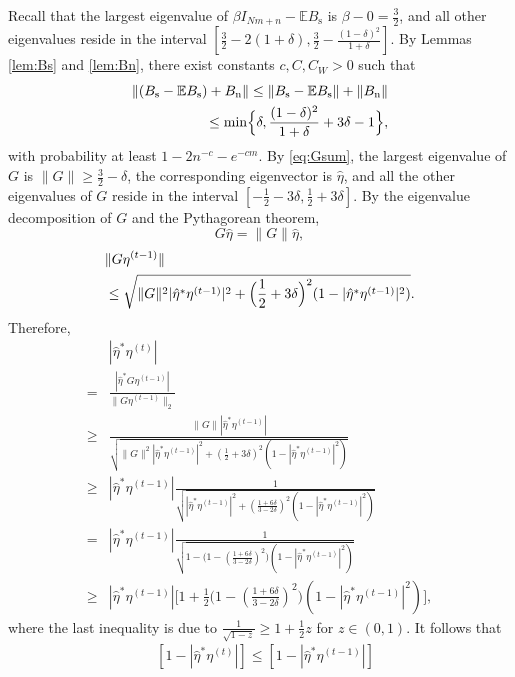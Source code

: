 \documentclass[11pt,journal]{IEEEtran}
\newcommand{\bbE}{\mathbb{E}}
\newcommand{\rms}{\mathrm{s}}
\newcommand{\rmn}{\mathrm{n}}
\newcommand{\norm}[1]{\|{#1}\|}
\begin{document}
\begin{IEEEproof}
Recall that the largest eigenvalue of $\beta I_{Nm+n} - \bbE B_\rms$ is $\beta - 0 = \frac{3}{2}$, and all other eigenvalues reside in the interval $[\frac{3}{2} - 2(1+\delta), \frac{3}{2} - \frac{(1-\delta)^2}{1+\delta}]$. By Lemmas \ref{lem:Bs} and \ref{lem:Bn}, there exist constants $c,C,C_W>0$ such that
\begin{align*}
\norm{(B_\rms - \bbE B_\rms) + B_\rmn} \leq \norm{B_\rms - \bbE B_\rms} + \norm{B_\rmn} \\
\leq \min\Bigl\{\delta, \frac{(1-\delta)^2}{1+\delta} +3\delta -1\Bigr\},
\end{align*}
with probability at least $1-2n^{-c}-e^{-cm}$. By \eqref{eq:Gsum}, the largest eigenvalue of $G$ is $\norm{G} \geq \frac{3}{2} - \delta$, the corresponding eigenvector is $\hat{\eta}$, and all the other eigenvalues of $G$ reside in the interval $[-\frac{1}{2}-3\delta, \frac{1}{2}+3\delta]$.
By the eigenvalue decomposition of $G$ and the Pythagorean theorem,
\[
G\hat{\eta} =\norm{G} \hat{\eta},
\]
\begin{align*}
&\norm{G\eta^{(t-1)}} \\
&\leq \sqrt{\norm{G}^2|\hat{\eta}^*\eta^{(t-1)}|^2+\Bigl(\frac{1}{2}+3\delta\Bigr)^2(1- |\hat{\eta}^*\eta^{(t-1)}|^2)}.
\end{align*}
Therefore,
\begin{align*}
& |\hat{\eta}^*\eta^{(t)}| \\
= & \frac{|\hat{\eta}^*G\eta^{(t-1)}|}{\norm{G\eta^{(t-1)}}_2} \\
\geq & \frac{\norm{G}|\hat{\eta}^*\eta^{(t-1)}|}{\sqrt{\norm{G}^2|\hat{\eta}^*\eta^{(t-1)}|^2+(\frac{1}{2}+3\delta)^2(1- |\hat{\eta}^*\eta^{(t-1)}|^2)}} \\
\geq & |\hat{\eta}^*\eta^{(t-1)}| \frac{1}{\sqrt{|\hat{\eta}^*\eta^{(t-1)}|^2+(\frac{1+6\delta}{3-2\delta})^2(1- |\hat{\eta}^*\eta^{(t-1)}|^2)}} \\
= & |\hat{\eta}^*\eta^{(t-1)}| \frac{1}{\sqrt{1-\bigl(1-(\frac{1+6\delta}{3-2\delta})^2\bigr)(1- |\hat{\eta}^*\eta^{(t-1)}|^2)}} \\
\geq & |\hat{\eta}^*\eta^{(t-1)}| \Big[ 1 + \frac{1}{2} \bigl(1-(\frac{1+6\delta}{3-2\delta})^2\bigr)(1- |\hat{\eta}^*\eta^{(t-1)}|^2) \Big],
\end{align*}
where the last inequality is due to $\frac{1}{\sqrt{1-z}} \geq 1 + \frac{1}{2}z$ for $z\in (0,1)$. It follows that
\begin{align}
& [1 - |\hat{\eta}^*\eta^{(t)}|] \leq [1 - |\hat{\eta}^*\eta^{(t-1)}|]  \nonumber\\

\end{align}
\end{IEEEproof}
\end{document}
